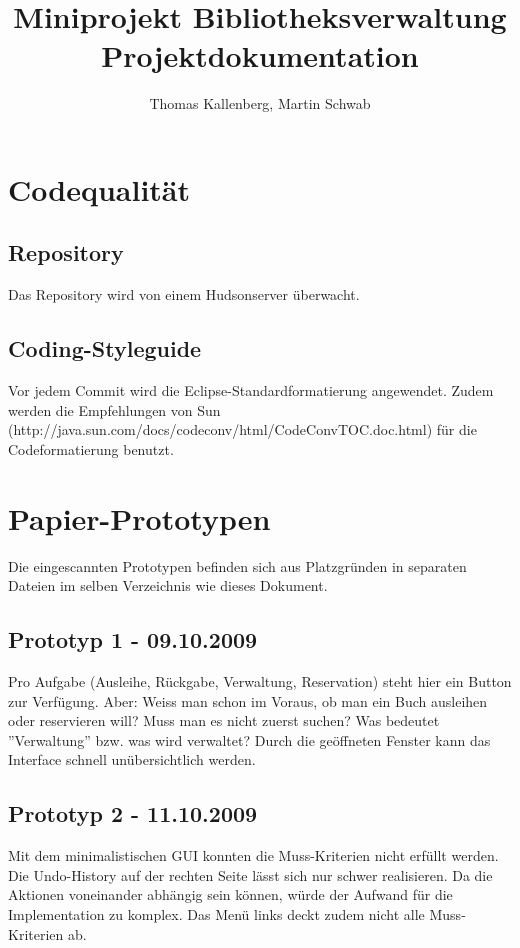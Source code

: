 \documentclass[10pt, a4paper]{scrartcl}
\title{Miniprojekt Bibliotheksverwaltung \\ \normalsize{Projektdokumentation}}
\author{Thomas Kallenberg, Martin Schwab}
\begin{document}
\maketitle
\section{Codequalität}
\subsection{Repository}
Das Repository wird von einem Hudsonserver überwacht.

\subsection{Coding-Styleguide}
Vor jedem Commit wird die Eclipse-Standardformatierung angewendet. Zudem werden die Empfehlungen von Sun (http://java.sun.com/docs/codeconv/html/CodeConvTOC.doc.html) für die Codeformatierung benutzt.

\section{Papier-Prototypen}
Die eingescannten Prototypen befinden sich aus Platzgründen in separaten Dateien im selben Verzeichnis wie dieses Dokument.

\subsection{Prototyp 1 - 09.10.2009}
Pro Aufgabe (Ausleihe, Rückgabe, Verwaltung, Reservation) steht hier ein Button zur Verfügung. Aber: Weiss man schon im Voraus, ob man ein Buch ausleihen oder reservieren will? Muss man es nicht zuerst suchen? Was bedeutet ''Verwaltung'' bzw. was wird verwaltet? Durch die geöffneten Fenster kann das Interface schnell unübersichtlich werden.

\subsection{Prototyp 2 - 11.10.2009}
Mit dem minimalistischen GUI konnten die Muss-Kriterien nicht erfüllt werden. Die Undo-History auf der rechten Seite lässt sich nur schwer realisieren. Da die Aktionen voneinander abhängig sein können, würde der Aufwand für die Implementation zu komplex. Das Menü links deckt zudem nicht alle Muss-Kriterien ab.
\end{document}
